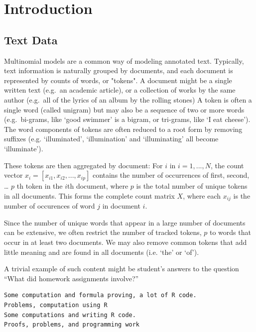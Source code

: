 \documentclass[12pt]{article}
\begin{document}
\newpage


\section{Introduction}

\subsection{Text Data}




Multinomial models are a common way of modeling annotated text.
Typically, text information is naturally grouped by documents, and each
document is represented by counts of words, or "tokens". A document might be a
single written text (e.g.~an academic article), or a collection of works
by the same author (e.g.~all of the lyrics of an album by the rolling
stones) A token is often a single word (called unigram) but may also be
a sequence of two or more words (e.g.~bi-grams, like `good swimmer' is a
bigram, or tri-grams, like `I eat cheese'). The word components of
tokens are often reduced to a root form by removing suffixes (e.g.
`illuminated', `illumination' and `illuminating' all become
`illuminate').

These tokens are then aggregated by document: For $i$ in $i = 1,...,N$,
the count vector $x_i = [x_{i1}, x_{i2}, ... , x_{ip}]$ contains the
number of occurrences of first, second, \ldots{} $p$ th token in the
$i$th document, where $p$ is the total number of unique tokens in all
documents. This forms the complete count matrix $X$, where each $x_{ij}$
is the number of occurences of word $j$ in document $i$.

Since the number of unique words that appear in a large number of
documents can be extensive, we often restrict the number of tracked
tokens, $p$ to words that occur in at least two documents. We may also
remove common tokens that add little meaning and are found in all
documents (i.e. `the' or `of').

A trivial example of such content might be student's answers to the
question ``What did homework assignments involve?''

\begin{verbatim}
Some computation and formula proving, a lot of R code.
Problems, computation using R
Some computations and writing R code.
Proofs, problems, and programming work
\end{verbatim}
\end{document}

